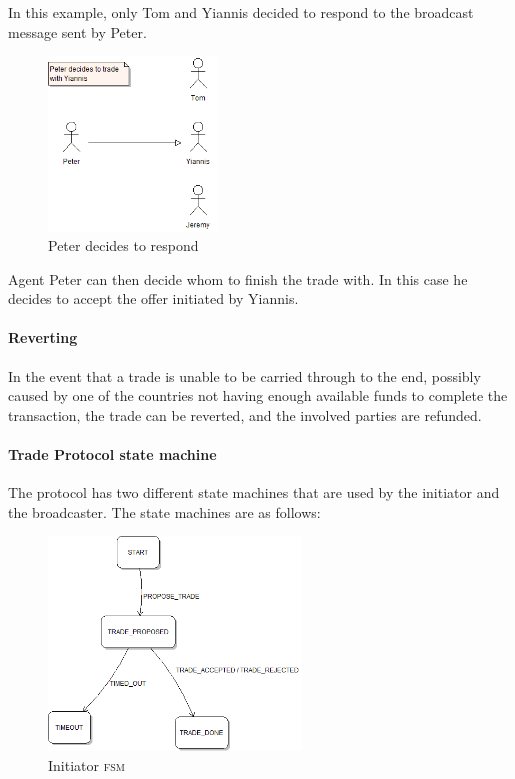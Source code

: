 In this example, only Tom and Yiannis decided to respond to the broadcast message sent by Peter.

\begin{figure}[h!]
	\centering
	\includegraphics[width=0.4\textwidth]{img/protocol3.png}
	\caption{Peter decides to respond}
	\label{fig:protocol3}
\end{figure}

Agent Peter can then decide whom to finish the trade with. In this case he decides to accept the offer initiated by Yiannis.

\paragraph{Reverting}

In the event that a trade is unable to be carried through to the end, possibly caused by one of the countries not having enough available funds to complete the transaction, the trade can be reverted, and the involved parties are refunded.

\paragraph{Trade Protocol state machine}

The protocol has two different state machines that are used by the initiator and the broadcaster. The state machines are as follows: 

\begin{figure}[h!]
	\centering
	\includegraphics[width=0.6\textwidth]{img/protocol-fsm-1.png}
	\caption{Initiator \textsc{fsm}}
	\label{fig:protocol-fsm-1}
\end{figure}

